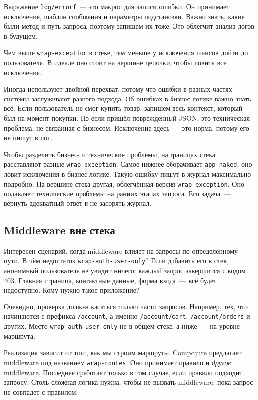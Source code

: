 \fi


Выражение \verb|log/errorf|~--- это макрос для записи ошибки. Он принимает
исключение, шаблон сообщения и параметры подстановки. Важно знать, какие были
метод и путь запроса, поэтому запишем их тоже. Это облегчит анализ логов в
будущем.

Чем выше \verb|wrap-exception| в стеке, тем меньше у исключения шансов дойти
до пользователя. В идеале оно стоит на вершине цепочки, чтобы ловить все
исключения.

Иногда используют двойной перехват, потому что ошибки в разных частях системы
заслуживают разного подхода. Об ошибках в бизнес-логике важно знать всё. Если
пользователь не смог купить товар, запишем весь контекст, который был на момент
покупки. Но если пришёл повреждённый JSON, это техническая проблема, не
связанная с бизнесом. Исключение здесь~--- это норма, потому его не пишут в лог.

Чтобы разделить бизнес- и технические проблемы, на границах стека расставляют
разные \verb|wrap-exception|. Самое нижнее оборачивает \texttt{app\--na\-ked}:
оно ловит исключения в бизнес-логике. Такую ошибку пишут в журнал максимально
подробно. На вершине стека другая, облегчённая версия \verb|wrap-exception|.
Оно подавляет технические проблемы на ранних этапах запроса. Его задача~---
вернуть адекватный ответ и не засорять журнал.

\subsection{Middleware вне стека}


Интересен сценарий, когда middleware влияет на запросы по определённому пути. В
чём недостаток \verb|wrap-auth-user-only|? Если добавить его в стек, анонимный
пользователь не увидит ничего: каждый запрос завершится с кодом 403. Главная
страница, контактные данные, форма входа~--- всё будет недоступно. Кому
нужно такое приложение?

Очевидно, проверка должна касаться только части запросов. Например, тех, что
начинаются с префикса \verb|/account|, а именно \verb|/account/cart|,
\verb|/account/orders| и других. Место \texttt{wrap\--auth\--user\--only} не в общем
стеке, а ниже~--- на уровне маршрута.

Реализация зависит от того, как мы строим маршруты. Compojure предлагает
middleware под названием \verb|wrap-routes|. Оно принимает правило и
\emph{другое} middleware. Последнее сработает только в том случае, если правило
подходит запросу. Столь сложная логика нужна, чтобы не вызвать middleware, пока
запрос не совпадет с правилом.

